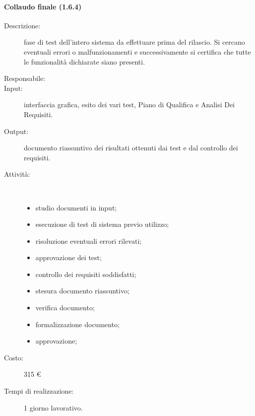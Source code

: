 \paragraph{Collaudo finale (1.6.4)}
\begin{description}
\item[Descrizione:] fase di test dell'intero sistema da effettuare prima del rilascio. Si cercano eventuali errori o malfunzionamenti e successivamente si certifica che tutte le funzionalit\`{a} dichiarate siano presenti.
\item[Responsabile:] 
\item[Input:] interfaccia grafica, esito dei vari test, Piano di Qualifica e Analisi Dei Requisiti.
\item[Output:] documento riassuntivo dei risultati ottenuti dai test e dal controllo dei requisiti.
\item[Attività:]\mbox{}\\[-1.5\baselineskip]
	\begin{itemize}
	\item studio documenti in input;
	\item esecuzione di test di sistema previo utilizzo;
	\item risoluzione eventuali errori rilevati;
	\item approvazione dei test;
	\item controllo dei requisiti soddisfatti;
	\item stesura documento riassuntivo;
	\item verifica documento;
	\item formalizzazione documento;
	\item approvazione;
	\end{itemize}
\item[Costo:] 315 \euro{}
\item[Tempi di realizzazione:] 1 giorno lavorativo.
\end{description}

